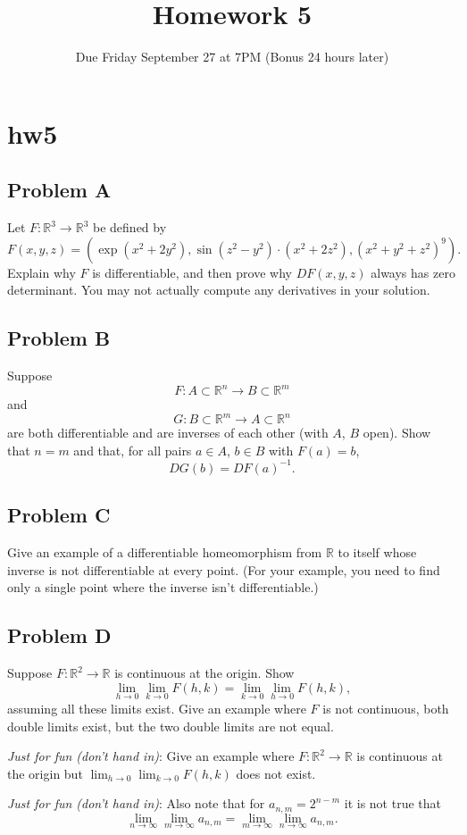 \documentclass[lang=en,11pt]{template}
\title{Homework 5}
\author{}
\date{Due Friday September 27 at 7PM (Bonus 24 hours later)}
\begin{document}
   

\chapter{hw5}

\section*{Problem A}
Let $F : \mathbb{R}^3 \to \mathbb{R}^3$ be defined by
\[
F(x, y, z) = (\exp(x^2 + 2y^2), \sin(z^2 - y^2) \cdot (x^2 + 2z^2), (x^2 + y^2 + z^2)^9).
\]
Explain why $F$ is differentiable, and then prove why $DF(x, y, z)$ always has zero determinant. You may not actually compute any derivatives in your solution.

\section*{Problem B}
Suppose
\[
F : A \subset \mathbb{R}^n \to B \subset \mathbb{R}^m
\]
and
\[
G : B \subset \mathbb{R}^m \to A \subset \mathbb{R}^n
\]
are both differentiable and are inverses of each other (with $A$, $B$ open). Show that $n = m$ and that, for all pairs $a \in A$, $b \in B$ with $F(a) = b$,
\[
DG(b) = DF(a)^{-1}.
\]

\section*{Problem C}
Give an example of a differentiable homeomorphism from $\mathbb{R}$ to itself whose inverse is not differentiable at every point. (For your example, you need to find only a single point where the inverse isn’t differentiable.)

\section*{Problem D}
Suppose $F : \mathbb{R}^2 \to \mathbb{R}$ is continuous at the origin. Show
\[
\lim_{h \to 0} \lim_{k \to 0} F(h, k) = \lim_{k \to 0} \lim_{h \to 0} F(h, k),
\]
assuming all these limits exist. Give an example where $F$ is not continuous, both double limits exist, but the two double limits are not equal.

\textit{Just for fun (don’t hand in)}: Give an example where $F : \mathbb{R}^2 \to \mathbb{R}$ is continuous at the origin but $\lim_{h \to 0} \lim_{k \to 0} F(h, k)$ does not exist.

\textit{Just for fun (don’t hand in)}: Also note that for $a_{n,m} = 2^{n-m}$ it is not true that
\[
\lim_{n \to \infty} \lim_{m \to \infty} a_{n,m} = \lim_{m \to \infty} \lim_{n \to \infty} a_{n,m}.
\]
\end{document}
